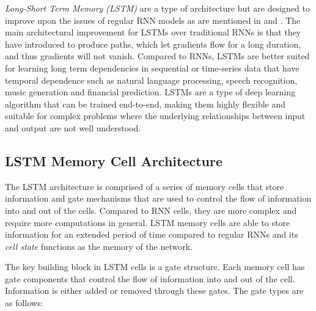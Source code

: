         \emph{Long-Short Term Memory (LSTM)} are a type of  architecture but are designed to improve upon the issues of regular RNN models as are mentioned in  and . 
        The main architectural improvement for LSTMs over traditional RNNs is that they have introduced  to produce paths, which let gradients flow for a long duration, and thus gradients will not vanish.
        Compared to RNNs, LSTMs are better suited for learning long term dependencies in sequential or time-series data that have temporal dependence such as natural language processing, speech recognition, music generation and financial prediction.
        LSTMs are a type of deep learning algorithm that can be trained end-to-end, making them highly flexible and suitable for complex problems where the underlying relationships between input and output are not well understood.



        \subsection{LSTM Memory Cell Architecture}
        \label{sec:lstm-memory-cell-architecture-background}

            The LSTM architecture is comprised of a series of memory cells that store information and gate mechanisms that are used to control the flow of information into and out of the cells.
            Compared to RNN cells, they are more complex and require more computations in general.
            LSTM memory cells are able to store information for an extended period of time compared to regular RNNs and its \emph{cell state} functions as the memory of the network.

            The key building block in LSTM cells is a gate structure.
            Each memory cell has gate components that control the flow of information into and out of the cell.
            Information is either added or removed through these gates.
            The gate types are as follows:


